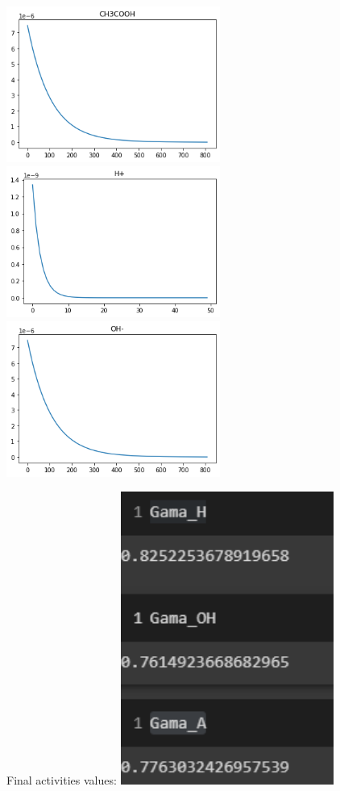 \documentclass{article}
\begin{document}
\begin{large}
\includegraphics[width=7cm]{2.png}\\
\includegraphics[width=7cm]{3.png}
\includegraphics[width=7cm]{4.png}
\end{large}
Final activities values: \includegraphics[width=7cm]{res.png}
\end{document}
